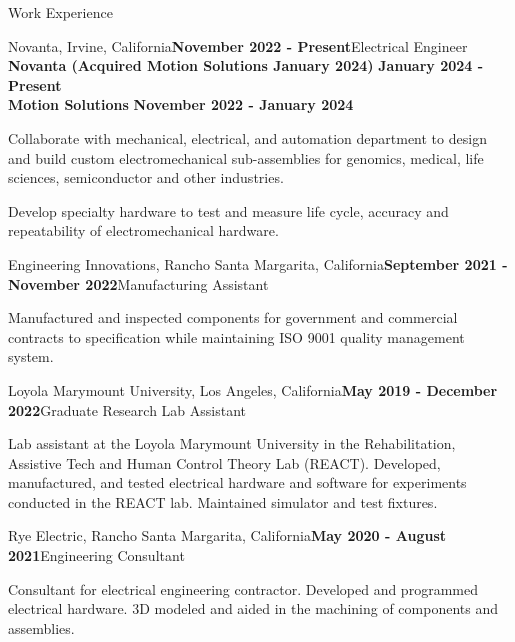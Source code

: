 \documentclass{resume} %
\begin{document}
	\begin{rSection}{Work Experience}
		
		\begin{rSubsection}{Novanta, Irvine, California}{\bf November 2022 - Present}{Electrical Engineer} {}
			{\textbf{Novanta (Acquired Motion Solutions January 2024)}} \hfill{{\bf January 2024 - Present}}\\
			{\textbf{Motion Solutions}} \hfill{{\bf November 2022 - January 2024}}
			\item Collaborate with mechanical, electrical, and automation department to design and build custom electromechanical sub-assemblies for genomics, medical, life sciences, semiconductor and other industries.
			\item Develop specialty hardware to test and measure life cycle, accuracy and repeatability of electromechanical hardware. 
		\end{rSubsection}
		
		\begin{rSubsection}{Engineering Innovations, Rancho Santa Margarita, California}{\bf September 2021 - November 2022}{Manufacturing Assistant}{}
			\item Manufactured and inspected components for government and commercial contracts to specification while maintaining ISO 9001 quality management system.    
		\end{rSubsection}
		
		\begin{rSubsection}{Loyola Marymount University, Los Angeles, California}{\bf May 2019 - December 2022}{Graduate Research Lab Assistant}{}
			\item Lab assistant at the Loyola Marymount University in the Rehabilitation, Assistive Tech and Human Control Theory Lab (REACT). Developed, manufactured, and tested electrical hardware and software for experiments conducted in the REACT lab. Maintained simulator and test fixtures.    
		\end{rSubsection}
		
		\begin{rSubsection}{Rye Electric, Rancho Santa Margarita, California}{\bf May 2020 - August 2021}{Engineering Consultant}{}
			\item Consultant for electrical engineering contractor. Developed and programmed electrical hardware. 3D modeled and aided in the machining of components and assemblies. 
		\end{rSubsection}
		

\end{rSection}
\end{document}
